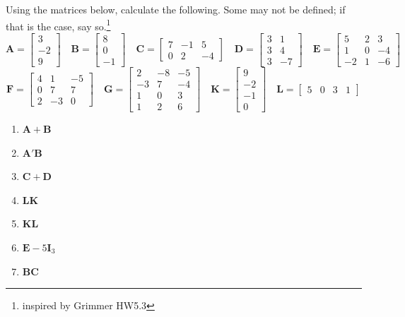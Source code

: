 \documentclass[11pt]{article}
\begin{document}
Using the matrices below, calculate the following. Some may not be
defined; if that is the case, say so.\footnote{inspired by Grimmer HW5.3}
\[
\mathbf{A} = \begin{bmatrix} 3 \\ -2 \\ 9 \end{bmatrix}
\quad
\mathbf{B} = \begin{bmatrix} 8 \\ 0 \\ -1 \end{bmatrix}
\quad
\mathbf{C} = \begin{bmatrix} 7 & -1 & 5 \\ 0 & 2 & -4 \end{bmatrix}
\quad
\mathbf{D} = \begin{bmatrix} 3 & 1 \\ 3 & 4 \\ 3 & -7 \end{bmatrix}
\quad
\mathbf{E} = \begin{bmatrix} 5 & 2 & 3 \\ 1 & 0 & -4 \\ -2 & 1 & -6 \end{bmatrix}
\]
\[
\mathbf{F} = \begin{bmatrix} 4 & 1 & -5 \\ 0 & 7 & 7 \\ 2 & -3 & 0 \end{bmatrix}
\quad
\mathbf{G} = \begin{bmatrix} 2 & -8 & -5 \\ -3 & 7 & -4 \\ 1 & 0 & 3 \\ 1 & 2 & 6 \end{bmatrix}
\quad
\mathbf{K} = \begin{bmatrix} 9 \\ -2 \\ -1 \\ 0 \end{bmatrix}
\quad
\mathbf{L} = \begin{bmatrix} 5 & 0 & 3 & 1 \end{bmatrix}
\]

\begin{enumerate}[label=\alph*.]
\item \(\mathbf{A} + \mathbf{B}\)
\item \(\mathbf{A}' \mathbf{B}\)
\item \(\mathbf{C} + \mathbf{D}\)
\item \(\mathbf{LK}\)
\item \(\mathbf{KL}\)
\item \(\mathbf{E} - 5\mathbf{I}_3\)
\item \(\mathbf{BC}\)
\end{enumerate}


\end{document}

